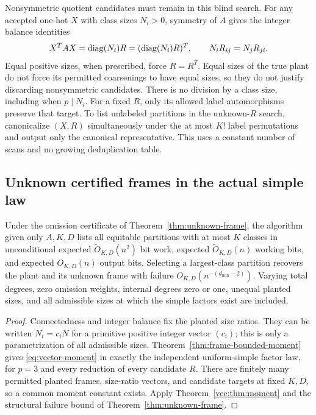 Nonsymmetric quotient candidates must remain in this blind search.
For any accepted one-hot $X$ with class sizes $N_i>0$, symmetry of
$A$ gives the integer balance identities
\[
 X^TAX=\operatorname{diag}(N_i)R=(\operatorname{diag}(N_i)R)^T,
 \qquad N_iR_{ij}=N_jR_{ji}.
\]
Equal positive sizes, when prescribed, force $R=R^T$. Equal sizes
of the true plant do not force its permitted coarsenings to have
equal sizes, so they do not justify discarding nonsymmetric candidates.
There is no division by a class size, including when $p\mid N_i$.
For a fixed $R$, only its allowed label automorphisms preserve that
target. To list unlabeled partitions in the unknown-$R$ search,
canonicalize $(X,R)$ simultaneously under the at most $K!$ label
permutations and output only the canonical representative. This
uses a constant number of scans and no growing deduplication table.

\subsection{Unknown certified frames in the actual simple law}
\begin{corollary}
\label{vec:cor:frame}
Under the omission certificate of
Theorem~\ref{thm:unknown-frame}, the algorithm given only $A,K,D$
lists all equitable partitions with at most $K$ classes in
unconditional expected $\widetilde O_{K,D}(n^2)$ bit work, expected
$\widetilde O_{K,D}(n)$ working bits, and expected $O_{K,D}(n)$
output bits. Selecting a largest-class partition recovers the plant
and its unknown frame with failure $O_{K,D}(n^{-(d_{\min}-2)})$.
Varying total degrees, zero omission weights, internal degrees zero or
one, unequal planted sizes, and all
admissible sizes at which the simple factors exist are included.
\end{corollary}
\begin{proof}
Connectedness and integer balance fix the planted size ratios.
They can be written $N_i=c_iN$ for a primitive positive integer vector
$(c_i)$; this is only a parametrization of all admissible sizes.
Theorem~\ref{thm:frame-bounded-moment} gives
\eqref{eq:vector-moment} in exactly the independent uniform-simple
factor law, for $p=3$ and every reduction of every candidate $R$.
There are finitely many permitted planted frames, size-ratio vectors,
and candidate targets at fixed $K,D$, so a common moment constant
exists. Apply Theorem~\ref{vec:thm:moment} and the structural failure
bound of Theorem~\ref{thm:unknown-frame}.
\end{proof}

